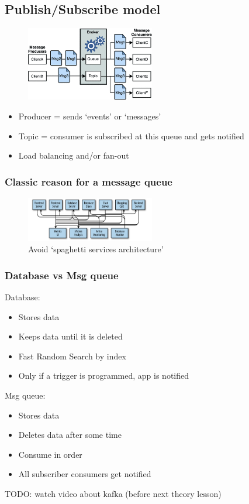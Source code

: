 \documentclass{article}
\begin{document}
\subsection{Publish/Subscribe model}

\begin{figure}[H]
    \centering
    \includegraphics[width=0.5\textwidth]{publish-subscribe-model.png}
\end{figure}


\begin{itemize}
    \item Producer = sends `events' or `messages'
    \item Topic = consumer is subscribed at this queue and gets notified
    \item Load balancing and/or fan-out
\end{itemize}

\subsubsection{Classic reason for a message queue}

\begin{figure}[H]
    \centering
    \includegraphics[width=0.5\textwidth]{msg-queue-spaghetti.png}
    \caption{Avoid `spaghetti services architecture'}
\end{figure}

\subsubsection{Database vs Msg queue}

Database:

\begin{itemize}
    \item Stores data
    \item Keeps data until it is deleted
    \item Fast Random Search by index
    \item Only if a trigger is programmed, app is notified
\end{itemize}

Msg queue:

\begin{itemize}
    \item Stores data
    \item Deletes data after some time
    \item Consume in order
    \item All subscriber consumers get notified
\end{itemize}

TODO: watch video about kafka (before next theory lesson)
\end{document}
